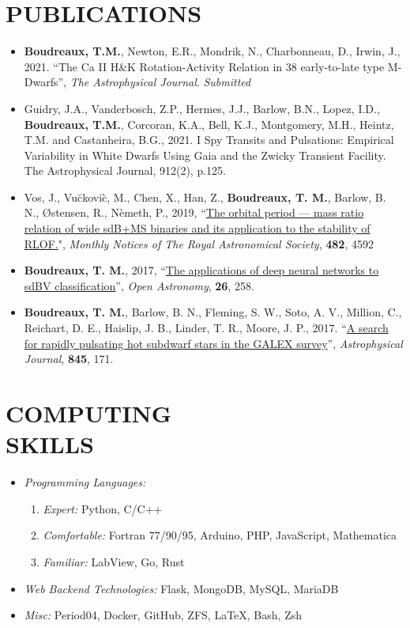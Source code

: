 \documentclass[margin, 10pt]{res} %
\begin{document}
\begin{resume}
\section{PUBLICATIONS}
\begin{itemize}
	\item \textbf{Boudreaux, T.M.}, Newton, E.R., Mondrik, N., Charbonneau, D., Irwin, J., 2021. ``The Ca II H\&K Rotation-Activity Relation in 38 early-to-late type M-Dwarfs'', \textit{The Astrophysical Journal}. \textit{Submitted}
\item Guidry, J.A., Vanderbosch, Z.P., Hermes, J.J., Barlow, B.N., Lopez, I.D., \textbf{Boudreaux, T.M.}, Corcoran, K.A., Bell, K.J., Montgomery, M.H., Heintz, T.M. and Castanheira, B.G., 2021. I Spy Transits and Pulsations: Empirical Variability in White Dwarfs Using Gaia and the Zwicky Transient Facility. The Astrophysical Journal, 912(2), p.125.
\item Vos, J., Vu\u{c}kovi\`c, M., Chen, X., Han, Z., \textbf{Boudreaux, T. M.}, Barlow, B. N., \O stensen, R., N\`emeth, P., 2019, ``\href{https://ui.adsabs.harvard.edu/#abs/2019MNRAS.482.4592V/abstract}{The orbital period --- mass ratio relation of wide sdB+MS binaries and its application to the stability of RLOF.}", \textit{Monthly Notices of The Royal Astronomical Society}, \textbf{482}, 4592 
\item \textbf{Boudreaux, T. M.}, 2017, ``\href{https://ui.adsabs.harvard.edu/#abs/2017OAst...26..258B/abstract}{The applications of deep neural networks to sdBV classification}'', \textit{Open Astronomy}, \textbf{26}, 258.
\item \textbf{Boudreaux, T. M.}, Barlow, B. N., Fleming, S. W., Soto, A. V., Million, C., Reichart, D. E., Haislip, J. B., Linder, T. R., Moore, J. P., 2017. ``\href{https://ui.adsabs.harvard.edu/#abs/2017ApJ...845..171B/abstract}{A search for rapidly pulsating hot subdwarf stars in the GALEX survey}'', \textit{Astrophysical Journal}, \textbf{845}, 171.
\end{itemize}

\section{COMPUTING \\ SKILLS} 

\begin{itemize}
\item {\sl Programming Languages:} 
    \begin{enumerate}
        \item{\sl Expert: } Python, C/C++
        \item{\sl Comfortable: } Fortran 77/90/95, Arduino, PHP, JavaScript, Mathematica
        \item{\sl Familiar: } LabView, Go, Rust 
    \end{enumerate}
\item {\sl Web Backend Technologies:} Flask, MongoDB, MySQL, MariaDB
\item {\sl Misc:} Period04, Docker, GitHub, ZFS, LaTeX, Bash, Zsh
\end{itemize}
 

\end{resume}
\end{document}
